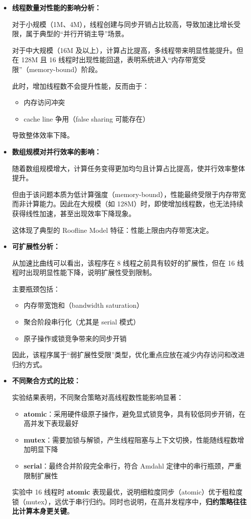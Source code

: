 \documentclass{SYSUReport}
\begin{document}
\begin{itemize}

\item \textbf{线程数量对性能的影响分析： }

    对于小规模（1M、4M），线程创建与同步开销占比较高，导致加速比增长受限，属于典型的“并行开销主导”场景。

    对于中大规模（16M 及以上），计算占比提高，多线程带来明显性能提升。但在 128M 且 16 线程时出现性能回退，表明系统进入“内存带宽受限”（memory-bound）阶段。

    此时，增加线程数不会提升性能，反而由于：
    \begin{itemize}
        \item 内存访问冲突
        \item cache line 争用（false sharing 可能存在）
    \end{itemize}
    导致整体效率下降。

\item \textbf{数组规模对并行效率的影响： }

    随着数组规模增大，计算任务变得更加均匀且计算占比提高，使并行效率整体提升。

    但由于该问题本质为低计算强度（memory-bound），性能最终受限于内存带宽而非计算能力。因此在大规模（如 128M）时，即使增加线程数，也无法持续获得线性加速，甚至出现效率下降现象。

    这体现了典型的 Roofline Model 特征：性能上限由内存带宽决定。

\item \textbf{可扩展性分析： }

    从加速比曲线可以看出，该程序在 8 线程之前具有较好的扩展性，但在 16 线程时出现明显性能下降，说明扩展性受到限制。

    主要瓶颈包括：
    \begin{itemize}
        \item 内存带宽饱和（bandwidth saturation）
        \item 聚合阶段串行化（尤其是 serial 模式）
        \item 原子操作或锁竞争带来的同步开销
    \end{itemize}

    因此，该程序属于“弱扩展性受限”类型，优化重点应放在减少内存访问和改进归约方式。

\item \textbf{不同聚合方式的比较： }

实验结果表明，不同聚合策略对高线程数性能影响显著：

\begin{itemize}
    \item \textbf{atomic}：采用硬件级原子操作，避免显式锁竞争，具有较低同步开销，在高并发下表现最好
    \item \textbf{mutex}：需要加锁与解锁，产生线程阻塞与上下文切换，性能随线程数增加明显下降
    \item \textbf{serial}：最终合并阶段完全串行，符合 Amdahl 定律中的串行瓶颈，严重限制扩展性
\end{itemize}

实验中 16 线程时 \textbf{atomic} 表现最优，说明细粒度同步（atomic）优于粗粒度锁（mutex），远优于串行归约。同时也说明，在高并发程序中，\textbf{归约策略往往比计算本身更关键}。
\end{itemize}
\end{document}
